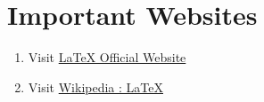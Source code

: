 \documentclass{article}
\begin{document}

\section{Important Websites}
\begin{enumerate}
	\item Visit \href{https://www.latex-project.org/}{\LaTeX{} Official Website}
	\item Visit \href{https://en.wikipedia.org/wiki/LaTeX}{Wikipedia : \LaTeX{}}
\end{enumerate}
\end{document}
